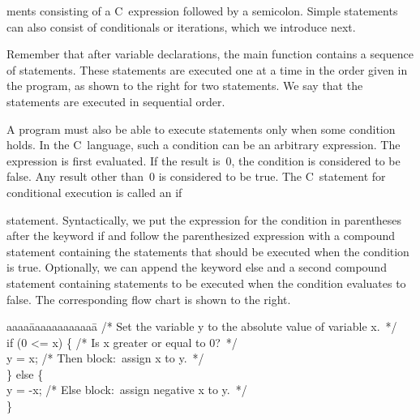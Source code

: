 \begin{minipage}{5.45in}
ments consisting of a C~expression followed by a 
semicolon.
%
Simple statements can also consist of conditionals or iterations, which
we introduce next.\mpline

Remember that after variable declarations, the {\tfix main} function
contains a sequence of statements.  These statements are executed one
at a time in the order given in the program, as shown to the right
for two statements.  We say that the statements are executed in
sequential order.\mpline

A program must also be able to execute statements only when 
some condition holds.  In the C~language, such a condition can be
an arbitrary expression.  The expression is first evaluated.
If the result is~0, the condition
is considered to be false.  Any result other than~0 is considered
to be true.  The C~statement
for conditional execution is called an {\tfix if}\linebreak\mpdone
\end{minipage}\hspace{0.25in}%
\begin{minipage}{0.8in}
\end{minipage}

\begin{minipage}{4.25in}
statement.  Syntactically, we put the expression for the condition
in parentheses after the keyword {\tfix if} and follow the parenthesized
expression with a compound statement containing the statements
that should be executed when the condition is true.  Optionally,
we can append the keyword {\tfix else} and a second compound
statement containing statements to be executed when the condition
evaluates to false.  
The corresponding flow chart is shown to the right.

{\fix
\begin{tabbing}
aaaa\=aaaaaaaaaaaa\=\kill
/* Set the variable y to the absolute value of variable x.~*/\\
if (0 <= x) \{\> \>/* Is x greater or equal to 0?~*/\\
\> y = x;     \>/* Then block:~assign x to y.~*/\\
\} else \{\\
\> y = -x;    \>/* Else block:~assign negative x to y.~*/\\
\}\\
\end{tabbing}
}
\end{minipage}\hspace{0.25in}%
\begin{minipage}{2in}
\end{minipage}

